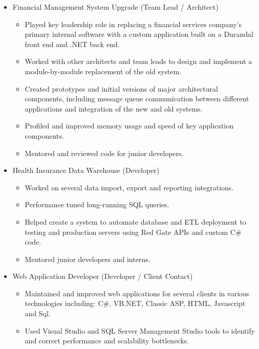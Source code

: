 \documentclass[12pt,letterpaper,sans]{moderncv}
\begin{document}
    \begin{itemize}[leftmargin=1.24in]
        \item Financial Management System Upgrade (Team Lead / Architect)
            \begin{itemize}
                \item Played key leadership role in replacing a financial services company's primary internal software with a custom application built on a Durandal front end and .NET back end.
                \item Worked with other architects and team leads to design and implement a module-by-module replacement of the old system.
                \item Created prototypes and initial versions of major architectural components, including message queue \mbox{communication} between different applications and integration of the new and old systems.
                \item Profiled and improved memory usage and speed of key application components.
                \item Mentored and reviewed code for junior developers.
            \end{itemize}
        \item Health Insurance Data Warehouse (Developer)
        	\begin{itemize}
	        	\item Worked on several data import, export and reporting integrations.
	        	\item Performance tuned long-running SQL queries.
	        	\item Helped create a system to automate database and ETL deployment to testing and production servers using Red Gate APIs and custom C\# code.
	        	\item Mentored junior developers and interns.
        	\end{itemize}
        \item Web Application Developer (Developer / Client Contact)
            \begin{itemize}
            	\item Maintained and improved web applications for several clients in various technologies including: C\#, VB.NET, Classic ASP, HTML, Javascript and Sql.
                \item Used Visual Studio and SQL Server Management Studio tools to identify and correct performance and scalability bottlenecks.
            \end{itemize}

\end{itemize}
\end{document}
